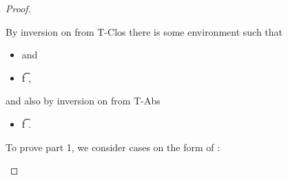 \begin{lemma}
\begin{proof}
\begin{case}[T-App]
\begin{itemize}
\begin{subcase}[B-BetaClosure]
         By inversion on  from T-Clos
         there is some environment {\propenvc{}} such that
         \begin{itemize}
           \item
               and
            \item
  \judgement {\propenvc{}} { {\ArrowOne {\x{}} {\s{}}
                                                       {\t{f}}
                                                       {
                                                                   {}}
                                                       {}}}
                {
                            {}}
                {},
         \end{itemize}
         and also by inversion on  from T-Abs
         \begin{itemize}
           \item
  { \judgement {\propenvc{}, {\isprop {\s{}} {\x{}}}}
              { {\t{f}}}
               {
                           {}}
               {}}.
         \end{itemize}

         To prove part 1, we consider cases on the form of :


\end{subcase}
\end{itemize}
\end{case}
\end{proof}
\end{lemma}
